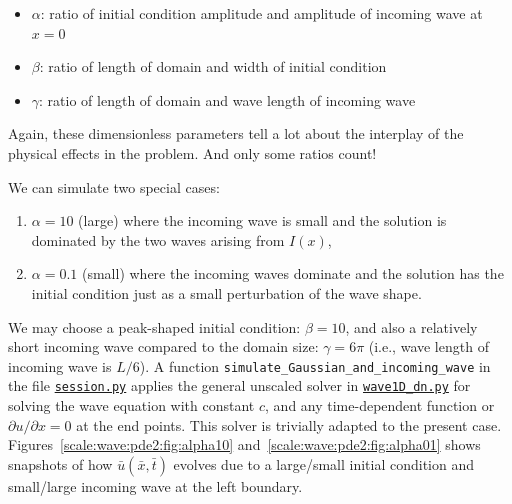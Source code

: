 \documentclass[graybox,envcountchap,sectrefs,final]{svmonodo}
\begin{document}
\begin{itemize}
 \item $\alpha$: ratio of initial condition amplitude and amplitude of incoming wave
   at $x=0$

 \item $\beta$: ratio of length of domain and width of initial condition

 \item $\gamma$: ratio of length of domain and wave length of incoming wave
\end{itemize}

\noindent
Again, these dimensionless parameters tell a lot about the interplay of
the physical effects in the problem. And only some ratios count!

We can simulate two special cases:

\begin{enumerate}
\item $\alpha=10$ (large) where the
   incoming wave is small and the solution is dominated by the two waves
   arising from $I(x)$,

\item $\alpha=0.1$ (small) where the incoming waves
   dominate and the solution has the initial condition just
   as a small perturbation of the wave shape.
\end{enumerate}

\noindent
We may choose a peak-shaped initial condition: $\beta = 10$,
and also a relatively short incoming wave compared to the domain size:
$\gamma = 6\pi$ (i.e., wave length of incoming wave is $L/6$).
A function \Verb!simulate_Gaussian_and_incoming_wave! in
the file \href{{http://tinyurl.com/o8pb3yy/session.py}}{\nolinkurl{session.py}}
applies the general unscaled
solver in \href{{http://tinyurl.com/o8pb3yy/wave1D_dn.py}}{\nolinkurl{wave1D_dn.py}}
for solving the wave equation with constant $c$,
and any time-dependent function or $\partial u/\partial x=0$ at the
end points. This solver is trivially adapted to the present case.
Figures~\ref{scale:wave:pde2:fig:alpha10} and~\ref{scale:wave:pde2:fig:alpha01}
shows snapshots of how $\bar u(\bar x,\bar t)$ evolves due to a
large/small initial condition and small/large incoming wave at the left
boundary.
\end{document}
